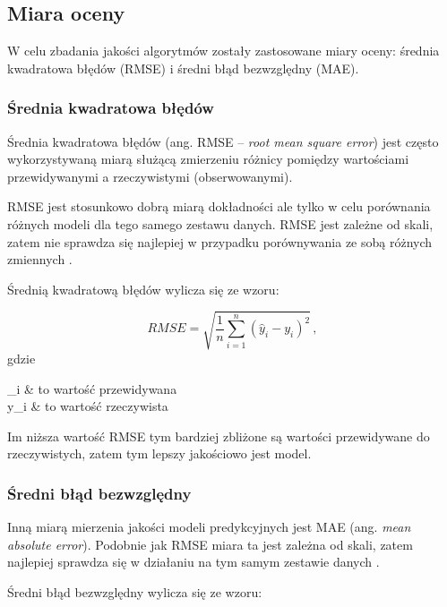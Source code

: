 \documentclass[twoside]{iisthesis}
\begin{document}
		\subsection{Miara oceny}
		
		W celu zbadania jakości algorytmów zostały zastosowane miary oceny: średnia kwadratowa błędów (RMSE) i średni błąd bezwzględny (MAE).
		
		\subsubsection{Średnia kwadratowa błędów}
	
		Średnia kwadratowa błędów (ang. RMSE -- \textit{root mean square error}) jest często wykorzystywaną miarą służącą zmierzeniu różnicy pomiędzy wartościami przewidywanymi a rzeczywistymi (obserwowanymi). 
		
		RMSE jest stosunkowo dobrą miarą dokładności ale tylko w celu porównania  różnych modeli dla tego samego zestawu danych. RMSE jest zależne od skali, zatem nie sprawdza się najlepiej w przypadku porównywania ze sobą różnych zmiennych \cite{hyndman2006another}.
		
		Średnią kwadratową błędów wylicza się ze wzoru:
		
		\begin{equation}
			\label{eq:rmse}
			RMSE = \sqrt{ \frac{1}{n} \sum_{i=1}^{n} (\hat{y}_i - y_i)^2 }
			\,,
		\end{equation}	
		gdzie
		
		\begin{conditions*}
			_i & to wartość przewidywana \\
			y_i  &  to wartość rzeczywista
		\end{conditions*} 
		
		Im niższa wartość RMSE tym bardziej zbliżone są wartości przewidywane do rzeczywistych, zatem tym lepszy jakościowo jest model. 
		
		\subsubsection{Średni błąd bezwzględny}
		
		Inną miarą mierzenia jakości modeli predykcyjnych jest MAE (ang. \textit{mean absolute error}). Podobnie jak RMSE miara ta jest zależna od skali, zatem najlepiej sprawdza się w działaniu na tym samym zestawie danych \cite{hyndman2006another}. 
		
		Średni błąd bezwzględny wylicza się ze wzoru:
		
\end{document}

